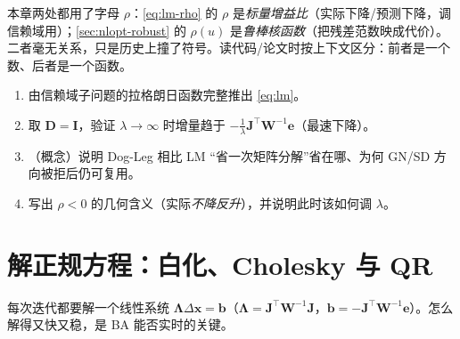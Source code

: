 \begin{pitfall}
本章两处都用了字母 $\rho$：\cref{eq:lm-rho} 的 $\rho$ 是\emph{标量增益比}（实际下降/预测下降，调信赖域用）；\cref{sec:nlopt-robust} 的 $\rho(u)$ 是\emph{鲁棒核函数}（把残差范数映成代价）。二者毫无关系，只是历史上撞了符号。读代码/论文时按上下文区分：前者是一个数、后者是一个函数。
\end{pitfall}

\begin{practice}
\begin{enumerate}
  \item 由信赖域子问题的拉格朗日函数完整推出 \cref{eq:lm}。
  \item 取 $\mathbf{D}=\mathbf{I}$，验证 $\lambda\to\infty$ 时增量趋于 $-\tfrac1\lambda\mathbf{J}^\top\mathbf{W}^{-1}\mathbf{e}$（最速下降）。
  \item （概念）说明 Dog-Leg 相比 LM “省一次矩阵分解”省在哪、为何 GN/SD 方向被拒后仍可复用。
  \item 写出 $\rho<0$ 的几何含义（实际\emph{不降反升}），并说明此时该如何调 $\lambda$。
\end{enumerate}
\end{practice}

\section{解正规方程：白化、Cholesky 与 QR}
\label{sec:nlopt-solve}

每次迭代都要解一个线性系统 $\boldsymbol{\Lambda}\Delta\mathbf{x}=\mathbf{b}$（$\boldsymbol{\Lambda}=\mathbf{J}^\top\mathbf{W}^{-1}\mathbf{J}$，$\mathbf{b}=-\mathbf{J}^\top\mathbf{W}^{-1}\mathbf{e}$）。怎么解得又快又稳，是 BA 能否实时的关键\cite{carlone2026handbook}。


